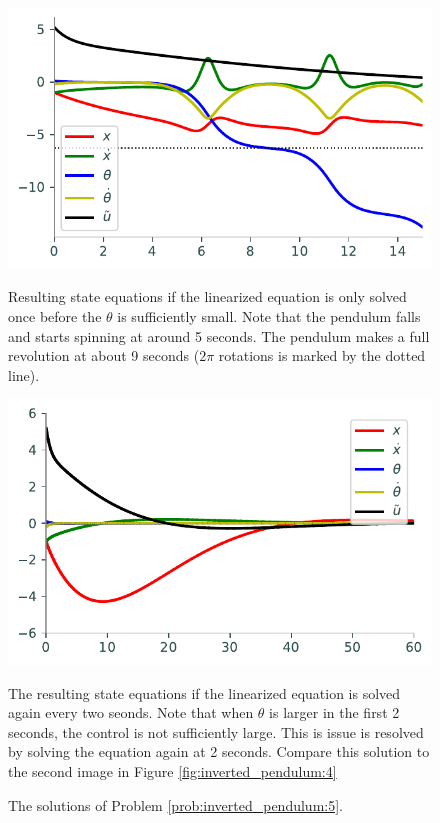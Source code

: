 \begin{figure}[H]
\begin{minipage}[b]{.47\linewidth}
\centering
\includegraphics[width=\textwidth]{figures/nonlinear_attempt1.pdf}
\caption*{Resulting state equations if the linearized equation is only solved once before the $\theta$ is sufficiently small. Note that the pendulum falls and starts spinning at around 5 seconds. The pendulum makes a full revolution at about 9 seconds ($2\pi$ rotations is marked by the dotted line).}
\end{minipage}
\hspace{0.5cm}
\begin{minipage}[b]{0.47\linewidth}
\centering
\includegraphics[width=\textwidth]{figures/nonlinear_attempt2.pdf}
\caption*{The resulting state equations if the linearized equation is solved again every two seonds. Note that when $\theta$ is larger in the first 2 seconds, the control is not sufficiently large. This is issue is resolved by solving the equation again at 2 seconds. Compare this solution to the second image in Figure \ref{fig:inverted_pendulum:4}}
\end{minipage}
\caption{The solutions of Problem \ref{prob:inverted_pendulum:5}.}
\label{fig:nonlinear_inverted_pendulum:5}
\end{figure}


